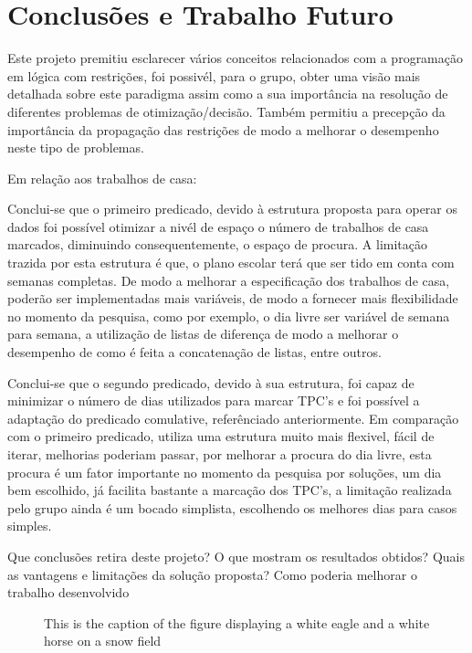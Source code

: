 \documentclass{llncs}
\begin{document}
\section{Conclusões e Trabalho Futuro}
Este projeto premitiu esclarecer vários conceitos relacionados com a programação em lógica com restrições, foi possivél, para o grupo, obter uma visão mais detalhada sobre este paradigma assim como a sua importância na resolução de diferentes problemas de otimização/decisão. Também permitiu a precepção da importância da propagação das restrições de modo a melhorar o desempenho neste tipo de problemas.


Em relação aos trabalhos de casa:

Conclui-se que o primeiro predicado, devido à estrutura proposta para operar os dados foi possível otimizar a nivél de espaço o número de trabalhos de casa marcados, diminuindo consequentemente, o espaço de procura. A limitação trazida por esta estrutura é que, o plano escolar terá que ser tido em conta com semanas completas.  De modo a melhorar a especificação dos trabalhos de casa, poderão ser implementadas mais variáveis, de modo a fornecer mais flexibilidade no momento da pesquisa, como por exemplo, o dia livre ser variável de semana para semana, a utilização de listas de diferença de modo a melhorar o desempenho de como é feita a concatenação de listas, entre outros.

Conclui-se que o segundo predicado, devido à sua estrutura, foi capaz de minimizar o número de dias utilizados para marcar TPC's e foi possível a adaptação do predicado comulative, referênciado anteriormente. Em comparação com o primeiro predicado, utiliza uma estrutura muito mais flexivel, fácil de iterar, melhorias poderiam passar, por melhorar a procura do dia livre, esta procura é um fator importante no momento da pesquisa por soluções, um dia bem escolhido, já facilita bastante a marcação dos TPC's, a limitação realizada pelo grupo ainda é um bocado simplista, escolhendo os melhores dias para casos simples.


 Que conclusões retira deste projeto? O que mostram os resultados obtidos? Quais as vantagens e limitações da
solução proposta? Como poderia melhorar o trabalho desenvolvido



\begin{figure}
\vspace{2.5cm}
\caption{This is the caption of the figure displaying a white eagle and
a white horse on a snow field}
\end{figure}
\end{document}
